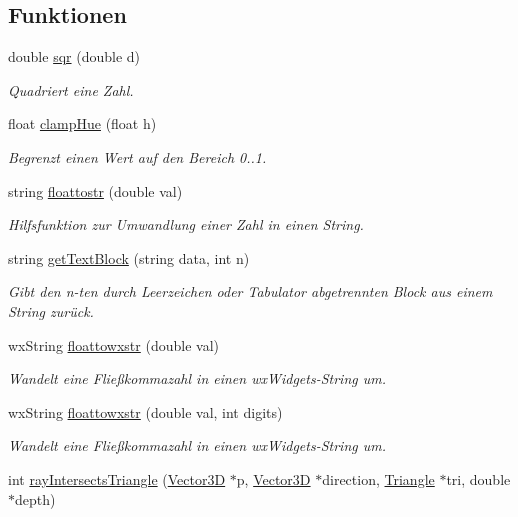 \subsection*{Funktionen}
\begin{DoxyCompactItemize}
\item 
double \hyperlink{namespaceUtils_afac34330dde6235ee7395a4fd412ae0d}{sqr} (double d)
\begin{DoxyCompactList}\small\item\em Quadriert eine Zahl. \end{DoxyCompactList}\item 
float \hyperlink{namespaceUtils_abb647325616858e0fad55290c36ea03b}{clamp\-Hue} (float h)
\begin{DoxyCompactList}\small\item\em Begrenzt einen Wert auf den Bereich 0..1. \end{DoxyCompactList}\item 
string \hyperlink{namespaceUtils_a76b506eef525971ab3ccb328f4ca879d}{floattostr} (double val)
\begin{DoxyCompactList}\small\item\em Hilfsfunktion zur Umwandlung einer Zahl in einen String. \end{DoxyCompactList}\item 
string \hyperlink{namespaceUtils_ab5711927eff2cdd7123d98d343f0dfad}{get\-Text\-Block} (string data, int n)
\begin{DoxyCompactList}\small\item\em Gibt den n-\/ten durch Leerzeichen oder Tabulator abgetrennten Block aus einem String zurück. \end{DoxyCompactList}\item 
wx\-String \hyperlink{namespaceUtils_a233ff9a0b34b10195a434f1ff66323b8}{floattowxstr} (double val)
\begin{DoxyCompactList}\small\item\em Wandelt eine Fließkommazahl in einen wx\-Widgets-\/\-String um. \end{DoxyCompactList}\item 
wx\-String \hyperlink{namespaceUtils_ac47160b3665d77f9e1a49a4045053add}{floattowxstr} (double val, int digits)
\begin{DoxyCompactList}\small\item\em Wandelt eine Fließkommazahl in einen wx\-Widgets-\/\-String um. \end{DoxyCompactList}\item 
int \hyperlink{namespaceUtils_a5f216cc7011a901130db81321b565334}{ray\-Intersects\-Triangle} (\hyperlink{classVector3D}{Vector3\-D} $\ast$p, \hyperlink{classVector3D}{Vector3\-D} $\ast$direction, \hyperlink{classTriangle}{Triangle} $\ast$tri, double $\ast$depth)

\end{DoxyCompactItemize}
